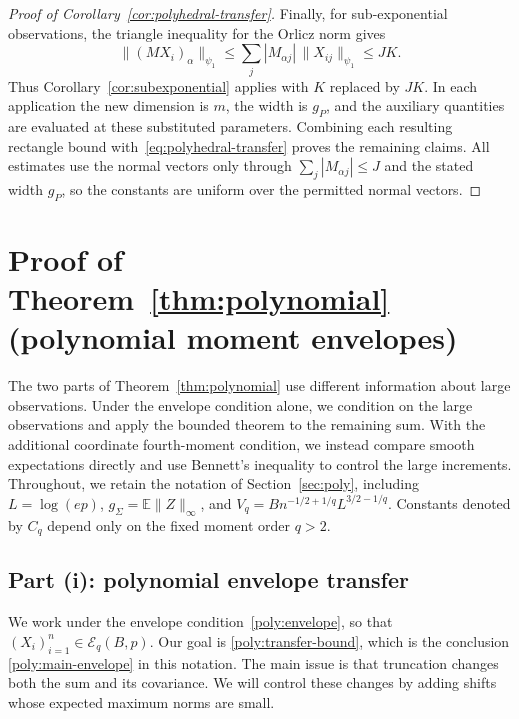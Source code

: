 \documentclass[11pt,letterpaper]{article}
\theoremstyle{remark}
\newcommand{\E}{\mathbb E}
\begin{document}
\begin{proof}[Proof of Corollary~\ref{cor:polyhedral-transfer}]
Finally, for sub-exponential observations, the triangle inequality
for the Orlicz norm gives
\[
 \|(MX_i)_\alpha\|_{\psi_1}
 \le\sum_j|M_{\alpha j}|\,\|X_{ij}\|_{\psi_1}\le JK.
\]
Thus Corollary~\ref{cor:subexponential} applies with $K$ replaced
by $JK$. In each application the new dimension is $m$, the width
is $g_P$, and the auxiliary quantities are evaluated at these
substituted parameters. Combining each resulting rectangle bound
with~\eqref{eq:polyhedral-transfer} proves the remaining claims.
All estimates use the normal vectors only through
$\sum_j|M_{\alpha j}|\le J$ and the stated width $g_P$, so the
constants are uniform over the permitted normal vectors.
\end{proof}

\section{\texorpdfstring{{Proof of Theorem~\ref*{thm:polynomial} (polynomial moment envelopes)}}{Proof of Theorem 2 (polynomial moment envelopes)}}\label{app:polynomial-proof}

The two parts of Theorem~\ref{thm:polynomial} use different information
about large observations. Under the envelope condition alone, we
condition on the large observations and apply the bounded theorem
to the remaining sum. With the additional coordinate fourth-moment
condition, we instead compare smooth expectations directly and use
Bennett's inequality to control the large increments. Throughout,
we retain the notation of Section~\ref{sec:poly}, including
$L=\log(ep)$, $g_\Sigma=\E\|Z\|_\infty$, and
$V_q=Bn^{-1/2+1/q}L^{3/2-1/q}$. Constants denoted by $C_q$ depend
only on the fixed moment order $q>2$.

\subsection{\texorpdfstring{{Part (i): polynomial envelope transfer}}{Part (i): polynomial envelope transfer}}\label{app:conditional}

We work under the envelope condition~\eqref{poly:envelope}, so that
$(X_i)_{i=1}^n\in\mathcal E_q(B,p)$. Our goal is
\eqref{poly:transfer-bound}, which is the conclusion
\eqref{poly:main-envelope} in this notation. The main issue is that
truncation changes both the sum and its covariance. We will control
these changes by adding shifts whose expected maximum norms are small.
\end{document}
